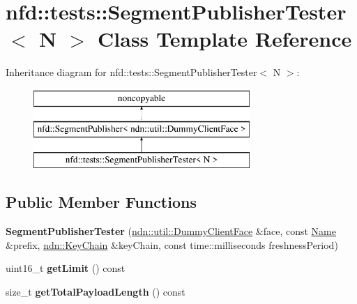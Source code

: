 \hypertarget{classnfd_1_1tests_1_1SegmentPublisherTester}{}\section{nfd\+:\+:tests\+:\+:Segment\+Publisher\+Tester$<$ N $>$ Class Template Reference}
\label{classnfd_1_1tests_1_1SegmentPublisherTester}
Inheritance diagram for nfd\+:\+:tests\+:\+:Segment\+Publisher\+Tester$<$ N $>$\+:\begin{figure}[H]
\begin{center}
\leavevmode
\includegraphics[height=3.000000cm]{classnfd_1_1tests_1_1SegmentPublisherTester}
\end{center}
\end{figure}
\subsection*{Public Member Functions}
\begin{DoxyCompactItemize}
\item 
{\bfseries Segment\+Publisher\+Tester} (\hyperlink{classndn_1_1util_1_1DummyClientFace}{ndn\+::util\+::\+Dummy\+Client\+Face} \&face, const \hyperlink{classndn_1_1Name}{Name} \&prefix, \hyperlink{classndn_1_1security_1_1KeyChain}{ndn\+::\+Key\+Chain} \&key\+Chain, const time\+::milliseconds freshness\+Period)\hypertarget{classnfd_1_1tests_1_1SegmentPublisherTester_ae4c61dcffdfadd106c39196539d4e11a}{}\label{classnfd_1_1tests_1_1SegmentPublisherTester_ae4c61dcffdfadd106c39196539d4e11a}

\item 
uint16\+\_\+t {\bfseries get\+Limit} () const\hypertarget{classnfd_1_1tests_1_1SegmentPublisherTester_acbf619fe7a127977d868bb2e6c54f3ed}{}\label{classnfd_1_1tests_1_1SegmentPublisherTester_acbf619fe7a127977d868bb2e6c54f3ed}

\item 
size\+\_\+t {\bfseries get\+Total\+Payload\+Length} () const\hypertarget{classnfd_1_1tests_1_1SegmentPublisherTester_a393ec199e346362edb4903cbe9ce125f}{}\label{classnfd_1_1tests_1_1SegmentPublisherTester_a393ec199e346362edb4903cbe9ce125f}

\end{DoxyCompactItemize}
